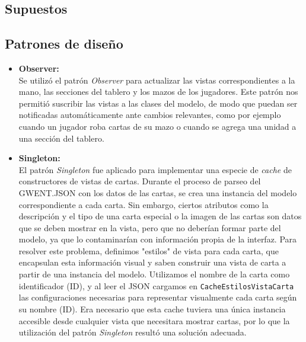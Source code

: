 \documentclass[titlepage,a4paper]{article}
\begin{document}
	\subsection{Supuestos}\label{sup:intro}

	\subsection{Patrones de diseño}\label{sup:patrones}

	\begin{itemize}
		\item \textbf{Observer:} \\
		Se utilizó el patrón \textit{Observer} para actualizar las vistas correspondientes a la mano, las secciones del tablero y los mazos de los jugadores. Este patrón nos permitió suscribir las vistas a las clases del modelo, de modo que puedan ser notificadas automáticamente ante cambios relevantes, como por ejemplo cuando un jugador roba cartas de su mazo o cuando se agrega una unidad a una sección del tablero.

		\item \textbf{Singleton:} \\
		El patrón \textit{Singleton} fue aplicado para implementar una especie de \textit{cache} de constructores de vistas de cartas. Durante el proceso de parseo del GWENT.JSON con los datos de las cartas, se crea una instancia del modelo correspondiente a cada carta. Sin embargo, ciertos atributos como la descripción y el tipo de una carta especial o la imagen de las cartas son datos que se deben mostrar en la vista, pero que no deberían formar parte del modelo, ya que lo contaminarían con información propia de la interfaz.
		Para resolver este problema, definimos "estilos" de vista para cada carta, que encapsulan esta información visual y saben construir una vista de carta a partir de una instancia del modelo. Utilizamos el nombre de la carta como identificador (ID), y al leer el JSON cargamos en \texttt{CacheEstilosVistaCarta} las configuraciones necesarias para representar visualmente cada carta según su nombre (ID).
		Era necesario que esta cache tuviera una única instancia accesible desde cualquier vista que necesitara mostrar cartas, por lo que la utilización del patrón \textit{Singleton} resultó una solución adecuada.


\end{itemize}
\end{document}
